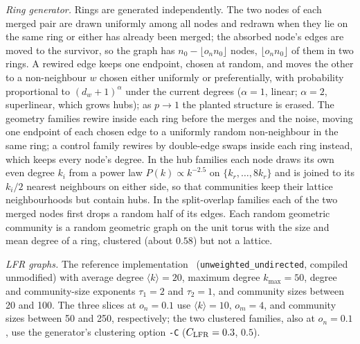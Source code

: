 \emph{Ring generator.} Rings are generated independently. The two nodes of each merged pair are drawn uniformly among all
nodes and redrawn when they lie on the same ring or either has already been merged; the
absorbed node's edges are moved to the survivor, so the graph has
$n_0-\lfloor o_n n_0\rfloor$ nodes, $\lfloor o_n n_0\rfloor$ of them in two rings. A
rewired edge keeps one endpoint, chosen at random, and moves the other to a non-neighbour
$w$ chosen either uniformly or preferentially, with probability proportional to
$(d_w+1)^\alpha$ under the current degrees ($\alpha=1$, linear; $\alpha=2$,
superlinear, which grows hubs); as $p\to1$ the planted structure is erased. The geometry
families rewire inside each ring before the merges and the noise, moving one endpoint of
each chosen edge to a uniformly random non-neighbour in the same ring; a control family
rewires by double-edge swaps inside each ring instead, which keeps every node's degree.
In the hub families each node draws its own even degree $k_i$ from a power law
$P(k)\propto k^{-2.5}$ on $\{k_r,\dots,8k_r\}$ and is joined to its $k_i/2$ nearest
neighbours on either side, so that communities keep their lattice neighbourhoods but
contain hubs. In the split-overlap families each of the two merged nodes first drops a
random half of its edges. Each random geometric community is a random geometric graph on
the unit torus with the size and mean degree of a ring, clustered (about $0.58$) but not
a lattice.

\emph{LFR graphs.} The reference implementation~\cite{lancichinetti2009benchmarks}
(\texttt{unweighted\_undirected}, compiled unmodified) with average degree
$\langle k\rangle=20$, maximum degree $k_{\max}=50$, degree and community-size exponents
$\tau_1=2$ and $\tau_2=1$, and community sizes between 20 and 100. The three slices at
$o_n=0.1$ use $\langle k\rangle=10$, $o_m=4$, and community sizes between 50 and 250,
respectively; the two clustered families, also at $o_n=0.1$, use the generator's
clustering option \texttt{-C} ($C_{\rm LFR}=0.3$, $0.5$).

